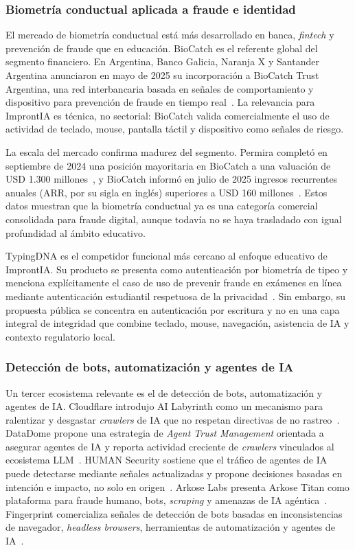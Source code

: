 \subsubsection{Biometría conductual aplicada a fraude e identidad}
El mercado de biometría conductual está más desarrollado en banca, \textit{fintech} y prevención de fraude que en educación. BioCatch es el referente global del segmento financiero. En Argentina, Banco Galicia, Naranja X y Santander Argentina anunciaron en mayo de 2025 su incorporación a BioCatch Trust Argentina, una red interbancaria basada en señales de comportamiento y dispositivo para prevención de fraude en tiempo real~\parencite{BioCatch2025Argentina}. La relevancia para ImprontIA es técnica, no sectorial: BioCatch valida comercialmente el uso de actividad de teclado, mouse, pantalla táctil y dispositivo como señales de riesgo.

La escala del mercado confirma madurez del segmento. Permira completó en septiembre de 2024 una posición mayoritaria en BioCatch a una valuación de USD 1.300 millones~\parencite{Permira2024}, y BioCatch informó en julio de 2025 ingresos recurrentes anuales (ARR, por su sigla en inglés) superiores a USD 160 millones~\parencite{BioCatch2025ARR}. Estos datos muestran que la biometría conductual ya es una categoría comercial consolidada para fraude digital, aunque todavía no se haya trasladado con igual profundidad al ámbito educativo.

TypingDNA es el competidor funcional más cercano al enfoque educativo de ImprontIA. Su producto se presenta como autenticación por biometría de tipeo y menciona explícitamente el caso de uso de prevenir fraude en exámenes en línea mediante autenticación estudiantil respetuosa de la privacidad~\parencite{TypingDNA}. Sin embargo, su propuesta pública se concentra en autenticación por escritura y no en una capa integral de integridad que combine teclado, mouse, navegación, asistencia de IA y contexto regulatorio local.

\subsubsection{Detección de bots, automatización y agentes de IA}
Un tercer ecosistema relevante es el de detección de bots, automatización y agentes de IA. Cloudflare introdujo AI Labyrinth como un mecanismo para ralentizar y desgastar \textit{crawlers} de IA que no respetan directivas de no rastreo~\parencite{Cloudflare2025}. DataDome propone una estrategia de \textit{Agent Trust Management} orientada a asegurar agentes de IA y reporta actividad creciente de \textit{crawlers} vinculados al ecosistema LLM~\parencite{DataDome2025}. HUMAN Security sostiene que el tráfico de agentes de IA puede detectarse mediante señales actualizadas y propone decisiones basadas en intención e impacto, no solo en origen~\parencite{HUMANSecurity2026}. Arkose Labs presenta Arkose Titan como plataforma para fraude humano, bots, \textit{scraping} y amenazas de IA agéntica~\parencite{ArksoseLabs}. Fingerprint comercializa señales de detección de bots basadas en inconsistencias de navegador, \textit{headless browsers}, herramientas de automatización y agentes de IA~\parencite{Fingerprint2026}.

